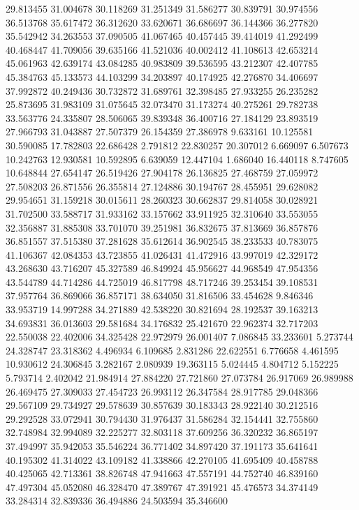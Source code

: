29.813455
31.004678
30.118269
31.251349
31.586277
30.839791
30.974556
36.513768
35.617472
36.312620
33.620671
36.686697
36.144366
36.277820
35.542942
34.263553
37.090505
41.067465
40.457445
39.414019
41.292499
40.468447
41.709056
39.635166
41.521036
40.002412
41.108613
42.653214
45.061963
42.639174
43.084285
40.983809
39.536595
43.212307
42.407785
45.384763
45.133573
44.103299
34.203897
40.174925
42.276870
34.406697
37.992872
40.249436
30.732872
31.689761
32.398485
27.933255
26.235282
25.873695
31.983109
31.075645
32.073470
31.173274
40.275261
29.782738
33.563776
24.335807
28.506065
39.839348
36.400716
27.184129
23.893519
27.966793
31.043887
27.507379
26.154359
27.386978
9.633161
10.125581
30.590085
17.782803
22.686428
2.791812
22.830257
20.307012
6.669097
6.507673
10.242763
12.930581
10.592895
6.639059
12.447104
1.686040
16.440118
8.747605
10.648844
27.654147
26.519426
27.904178
26.136825
27.468759
27.059972
27.508203
26.871556
26.355814
27.124886
30.194767
28.455951
29.628082
29.954651
31.159218
30.015611
28.260323
30.662837
29.814058
30.028921
31.702500
33.588717
31.933162
33.157662
33.911925
32.310640
33.553055
32.356887
31.885308
33.701070
39.251981
36.832675
37.813669
36.857876
36.851557
37.515380
37.281628
35.612614
36.902545
38.233533
40.783075
41.106367
42.084353
43.723855
41.026431
41.472916
43.997019
42.329172
43.268630
43.716207
45.327589
46.849924
45.956627
44.968549
47.954356
43.544789
44.714286
44.725019
46.817798
48.717246
39.253454
39.108531
37.957764
36.869066
36.857171
38.634050
31.816506
33.454628
9.846346
33.953719
14.997288
34.271889
42.538220
30.821694
28.192537
39.163213
34.693831
36.013603
29.581684
34.176832
25.421670
22.962374
32.717203
22.550038
22.402006
34.325428
22.972979
26.001407
7.086845
33.233601
5.273744
24.328747
23.318362
4.496934
6.109685
2.831286
22.622551
6.776658
4.461595
10.930612
24.306845
3.282167
2.080939
19.363115
5.024445
4.804712
5.152225
5.793714
2.402042
21.984914
27.884220
27.721860
27.073784
26.917069
26.989988
26.469475
27.309033
27.454723
26.993112
26.347584
28.917785
29.048366
29.567109
29.734927
29.578639
30.857639
30.183343
28.922140
30.212516
29.292528
33.072941
30.794430
31.976437
31.586284
32.154441
32.755860
32.748984
32.994089
32.225277
32.803118
37.609256
36.320232
36.865197
37.494997
35.942053
35.546224
36.771402
34.897420
37.191173
35.641641
40.195302
41.314022
43.109182
41.338866
42.270105
41.695409
40.458788
40.425065
42.713361
38.826748
47.941663
47.557191
44.752740
46.839160
47.497304
45.052080
46.328470
47.389767
47.391921
45.476573
34.374149
33.284314
32.839336
36.494886
24.503594
35.346600
